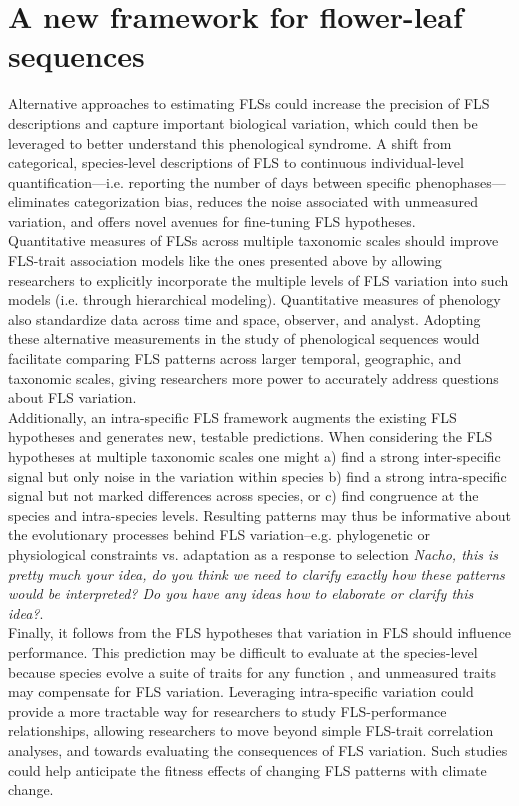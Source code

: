 \documentclass[12pt]{article}
\begin{document}
\section*{A new framework for flower-leaf sequences} 

\noindent Alternative approaches to estimating FLSs could increase the precision of FLS descriptions and capture important biological variation, which could then be leveraged to better understand this phenological syndrome. A shift from categorical, species-level descriptions of FLS to continuous individual-level quantification---i.e. reporting the number of days between specific phenophases---eliminates categorization bias, reduces the noise associated with unmeasured variation, and offers novel avenues for fine-tuning FLS hypotheses.\\ 

\noindent  Quantitative measures of FLSs across multiple taxonomic scales should improve FLS-trait association models like the ones presented above by allowing researchers to explicitly incorporate the multiple levels of FLS variation into such models (i.e. through hierarchical modeling). Quantitative measures of phenology \citep[e.g. the BBCH scale,][]{Finn2007} also standardize data across time and space, observer, and analyst. Adopting these alternative measurements in the study of phenological sequences would facilitate comparing FLS patterns across larger temporal, geographic, and taxonomic scales, giving researchers more power to accurately address questions about FLS variation.\\

\noindent Additionally, an intra-specific FLS framework augments the existing FLS hypotheses and generates new, testable predictions. When considering the FLS hypotheses at multiple taxonomic scales one might a) find a strong inter-specific signal but only noise in the variation within species b) find a strong intra-specific signal but not marked differences across species, or c) find congruence at the species and intra-species levels. Resulting patterns may thus be informative about the evolutionary processes behind FLS variation--e.g. phylogenetic or physiological constraints  vs. adaptation as a response to selection \emph{Nacho, this is pretty much your idea, do you think we need to clarify exactly how these patterns would be interpreted? Do you have any ideas how to elaborate or clarify this idea?}.\\

\noindent Finally, it follows from the FLS hypotheses that variation in FLS should influence performance. This prediction may be difficult to evaluate at the species-level because species evolve a suite of traits for any function \citep{Davies2019}, and unmeasured traits may compensate for FLS variation. Leveraging intra-specific variation could provide a more tractable way for researchers to study FLS-performance relationships, allowing researchers to move beyond simple FLS-trait correlation analyses, and towards evaluating the consequences of FLS variation. Such studies could help anticipate the fitness effects of changing FLS patterns with climate change.\\
\end{document}
